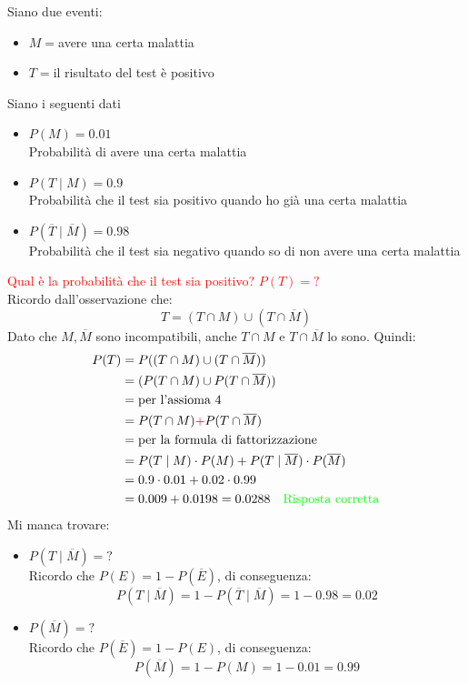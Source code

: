 \documentclass{article}  %
\theoremstyle{definition}
\begin{document}
\begin{esercizio}[Esercizio]
	Siano due eventi:
	\begin{itemize}
		\item $M=$avere una certa malattia
		\item $T=$il risultato del test è positivo
	\end{itemize}
	Siano i seguenti dati
	\begin{itemize}
		\item $P(M)=0.01$ \\
		      Probabilità di avere una certa malattia
		\item $P(T \mid M)=0.9$ \\
		      Probabilità che il test sia positivo quando ho già una certa malattia
		\item $P(\overline{T} \mid \overline{M})=0.98$ \\
		      Probabilità che il test sia negativo quando so di non avere una certa malattia
	\end{itemize}
	\textcolor{red}{Qual è la probabilità che il test sia positivo? $P(T)=?$} \\
	Ricordo dall'osservazione che:
	\[
		T=(T \cap M)\cup(T \cap \overline{M})
	\]
	Dato che $M, \overline{M}$ sono incompatibili, anche $T \cap M$ e $T \cap \overline{M}$ lo sono.
	Quindi:
	\begin{align*}
		P(T)
		 & = P((T \cap M) \cup (T \cap \overline{M}))                                 \\
		 & = (P(T \cap M) \cup P(T \cap \overline{M}))                                \\
		 & =\text{per l'assioma 4}                                                    \\
		 & =P(T \cap M) \textcolor{red}{+} P(T \cap \overline{M})                     \\
		 & = \text{per la formula di fattorizzazione}                                 \\
		 & = P(T \mid M) \cdot P(M) + P(T \mid \overline{M}) \cdot P(\overline{M})    \\
		 & = 0.9 \cdot 0.01 + 0.02 \cdot 0.99                                         \\
		 & =0.009 + 0.0198 = 0.0288 \quad \textcolor{green}{\text{Risposta corretta}}
	\end{align*}
	Mi manca trovare:
	\begin{itemize}
		\item $P(T \mid \overline{M})=?$ \\
		      Ricordo che $P(E)=1-P(\overline{E})$, di conseguenza:
		      \[
			      P(T \mid \overline{M})=1-P(\overline{T} \mid \overline{M})=1-0.98=0.02
		      \]
		\item $P(\overline{M})=?$ \\
		      Ricordo che $P(\overline{E})=1-P(E)$, di conseguenza:
		      \[
			      P(\overline{M})=1-P(M)=1-0.01=0.99
		      \]
	\end{itemize}
\end{esercizio}
\break
\end{document}
